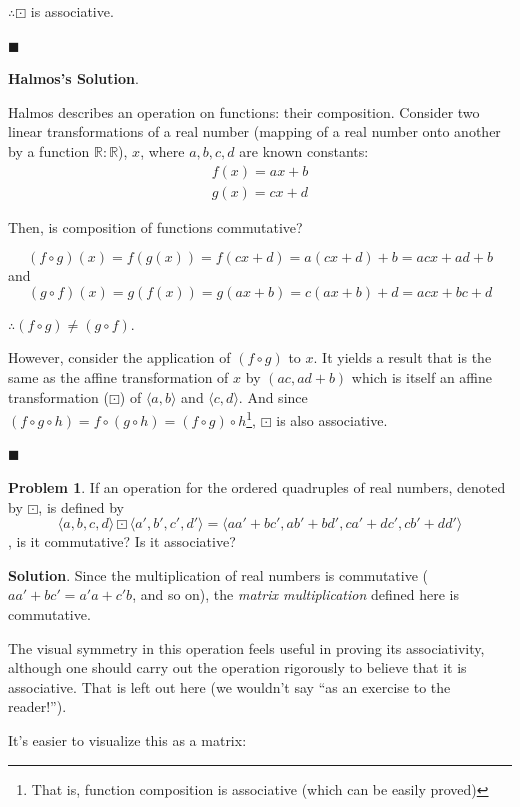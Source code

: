 \documentclass[english,notitlepage,smartquotes]{hgbreport}
\theoremstyle{definition}
\theoremstyle{definition}
\newtheorem{problem}{Problem}
\theoremstyle{remark}
\theoremstyle{plain}
\theoremstyle{definition}
\renewcommand\qedsymbol{$\blacksquare$}
\theoremstyle{definition}
\begin{document}
$\therefore \boxdot$ is associative.

\qedsymbol

\textbf{Halmos's Solution}.

Halmos describes an operation on functions: their composition. Consider two linear transformations of a real number (mapping of a real number onto another by a function $\mathbb {R}:\mathbb {R}$), $x$, where $a,b,c,d$ are known constants:
\begin{equation}
\!
\begin{aligned}
f(x)=ax+b \\
g(x)=cx+d
\end{aligned}\label{eq:fg}
\end{equation}

Then, is composition of functions commutative? 

$$
(f\circ g)(x)=f(g(x))=f(cx+d)=a(cx+d)+b=acx+ad+b
$$
and
$$
(g\circ f)(x)=g(f(x))=g(ax+b)=c(ax+b)+d=acx+bc+d
$$

$\therefore (f\circ g)\ne(g\circ f)$.

However, consider the application of $(f\circ g)$ to $x$. It yields a result that is the same as the affine transformation of $x$ by $(ac, ad+b)$ which is itself an affine transformation ($\boxdot$) of $\langle a,b\rangle$ and $\langle c,d\rangle$. And since $(f\circ g\circ h)=f\circ(g\circ h)=(f\circ g)\circ h$\footnote{That is, function composition is associative (which can be easily proved)}, $\boxdot$ is also associative. 

\qedsymbol

\begin{problem}
\label{pr:matrixmult}
If an operation for the ordered quadruples of real numbers, denoted by $\boxdot$, is defined by
$$
\langle a,b,c,d\rangle\boxdot\langle a',b',c',d'\rangle=\langle aa'+bc',ab'+bd',ca'+dc',cb'+dd'\rangle
$$
, is it commutative? Is it associative?
\end{problem}

\textbf{Solution}.
Since the multiplication of real numbers is commutative ($aa'+bc'=a'a+c'b$, and so on), the \textit{matrix multiplication} defined here is commutative.

The visual symmetry in this operation feels useful in proving its associativity, although one should carry out the operation rigorously to believe that it is associative. That is left out here (we wouldn't say ``as an exercise to the reader!'').

It's easier to visualize this as a matrix:
\end{document}
